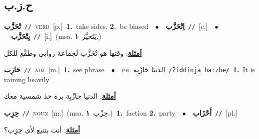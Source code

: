 \documentclass[10pt,a4paper,twoside]{article} %
\begin{document}
\begin{multicols}{2}
\vspace{-3mm}
\subsection*{\color{blue}\foreignlanguage{arabic}{ح.ز.ب}\color{blue}{}} 

{\setlength\topsep{0pt}\textbf{\foreignlanguage{arabic}{تْحَزَّب}}\ {\color{gray}\texttt{//}\color{black}}\ \textsc{verb}\ [p.]\ \textbf{1.}~take sides.  \textbf{2.}~be biased\ \ $\bullet$\ \ \setlength\topsep{0pt}\textbf{\foreignlanguage{arabic}{اِتْحَزَّب}}\ {\color{gray}\texttt{//}\color{black}}\ [c.]\ \ $\bullet$\ \ \setlength\topsep{0pt}\textbf{\foreignlanguage{arabic}{يِتْحَزَّب}}\ {\color{gray}\texttt{//}\color{black}}\ [i.]\ \color{gray}(msa. \foreignlanguage{arabic}{يَتَحيَّز}~\foreignlanguage{arabic}{\textbf{١.}})\color{black}\  \begin{flushright}\color{gray}\foreignlanguage{arabic}{\textbf{\underline{\foreignlanguage{arabic}{أمثلة}}}: وقتها هو تْحَزَّب لجماعة روابي وطقَّع للكل}\end{flushright}\color{black}} \vspace{2mm}

{\setlength\topsep{0pt}\textbf{\foreignlanguage{arabic}{حَازِب}}\ {\color{gray}\texttt{//}\color{black}}\ \textsc{adj}\ [m.]\ \textbf{1.}~see phrase\ \ $\bullet$\ \ \textsc{ph.} \color{gray} \foreignlanguage{arabic}{الدنيَا حَازْبِة}\color{black}\ {\color{gray}\texttt{/{\sffamily ʔiddinja ħaːzbe}/}\color{black}}\ \textbf{1.}~It is raining heavily\  \begin{flushright}\color{gray}\foreignlanguage{arabic}{\textbf{\underline{\foreignlanguage{arabic}{أمثلة}}}: الدنيا حازْبِة برة خذ شمسية معك}\end{flushright}\color{black}} \vspace{2mm}

{\setlength\topsep{0pt}\textbf{\foreignlanguage{arabic}{حِزِب}}\ {\color{gray}\texttt{//}\color{black}}\ \textsc{noun}\ [m.]\ \color{gray}(msa. \foreignlanguage{arabic}{حِزْب}~\foreignlanguage{arabic}{\textbf{١.}})\color{black}\ \textbf{1.}~faction  \textbf{2.}~party\ \ $\bullet$\ \ \setlength\topsep{0pt}\textbf{\foreignlanguage{arabic}{أَحْزَاب}}\ {\color{gray}\texttt{//}\color{black}}\ [pl.]\  \begin{flushright}\color{gray}\foreignlanguage{arabic}{\textbf{\underline{\foreignlanguage{arabic}{أمثلة}}}: أنت بتتبع لأي حِزِب؟}\end{flushright}\color{black}} \vspace{2mm}


\end{multicols}
\end{document}

